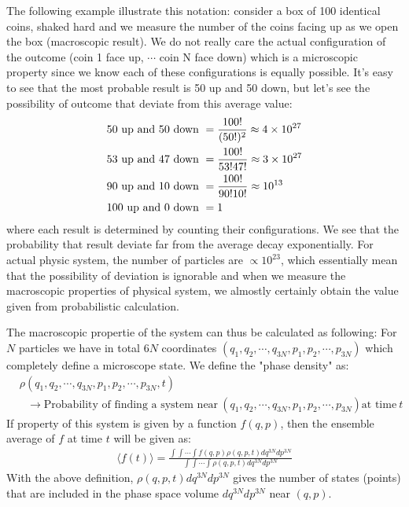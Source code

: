 \documentclass{article}
\begin{document}
The following example illustrate this notation: consider a box of 100 identical coins, shaked hard and we measure the number 
of the coins facing up as we open the box (macroscopic result). We do not really care the actual configuration of the outcome 
(coin 1 face up, $\cdots$ coin N face down)
which is a microscopic property since we know each of these configurations is equally possible. 
It's easy to see that the most probable result is 50 up and 50 down, but let's see the possibility of 
outcome that deviate from this average value:
\begin{align}
    \text{50 up and 50 down}\ &= \frac{100!}{(50!)^2} \approx 4 \times 10^{27} \notag \\ 
    \text{53 up and 47 down}\ &= \frac{100!}{53! 47!} \approx 3 \times 10^{27} \notag \\
    \text{90 up and 10 down}\ &= \frac{100!}{90! 10!} \approx 10^{13} \notag \\
    \text{100 up and 0 down}\ &= 1
\end{align}
where each result is determined by counting their configurations. We see that the probability that result deviate far from the 
average decay exponentially. For actual physic system, the number of particles are $\propto 10^{23}$, which essentially 
mean that the possibility of deviation is ignorable and when we measure the macroscopic properties of physical system, we almostly
certainly obtain the value given from probabilistic calculation.

The macroscopic propertie of the system can thus be calculated as following:
For $N$ particles we have in total $6N$ coordinates $(q_1, q_2, \cdots , q_{3N}, p_1, p_2, \cdots , p_{3N})$ which completely
define a microscope state. We define the "phase density" as:
\begin{align}
    &\rho(q_1, q_2, \cdots , q_{3N}, p_1, p_2, \cdots , p_{3N}, t) \\
     &\ \ \   \to \text{Probability of finding a system near}\ (q_1, q_2, \cdots , q_{3N}, p_1, p_2, \cdots , p_{3N}) \text{at time}\ t
\end{align}
If property of this system is given by a function $f(q,p)$, then the ensemble average of $f$ at time $t$ will be 
given as:
\begin{align}
    \langle f(t) \rangle = \frac{\int\int\cdots\int f(q,p)\rho(q,p,t)dq^{3N}dp^{3N}}{\int\int\cdots\int \rho(q,p,t)dq^{3N}dp^{3N}}
\end{align}
With the above definition, $\rho(q,p,t)dq^{3N}dp^{3N}$ gives the number of states (points) that are included in the phase space 
volume $dq^{3N}dp^{3N}$ near $(q,p)$.
\end{document}
